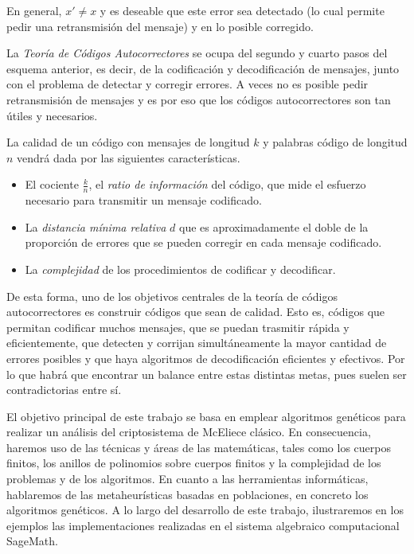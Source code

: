En general, $x' \neq x$ y es deseable que este error sea detectado (lo cual permite pedir una retransmisión del mensaje) y en lo posible corregido.

La \emph{Teoría de Códigos Autocorrectores} se ocupa del segundo y cuarto pasos del esquema anterior, es decir, de la codificación y decodificación de mensajes, junto con el problema de detectar y corregir errores. A veces no es posible pedir retransmisión de mensajes y es por eso que los códigos autocorrectores son tan útiles y necesarios.

La calidad de un código con mensajes de longitud $k$ y palabras código de longitud $n$ vendrá dada por las siguientes características.

\begin{itemize}
    \item El cociente $\frac{k}{n}$, el \emph{ratio de información} del código, que mide el esfuerzo necesario para transmitir un mensaje codificado.
    \item La \emph{distancia mínima relativa} $d$ que es aproximadamente el doble de la proporción de errores que se pueden corregir en cada mensaje codificado.
    \item La \emph{complejidad} de los procedimientos de codificar y decodificar.
\end{itemize}

De esta forma, uno de los objetivos centrales de la teoría de códigos autocorrectores es construir códigos que sean de calidad. Esto es, códigos que permitan codificar muchos mensajes, que se puedan trasmitir rápida y eficientemente, que detecten y corrijan simultáneamente la mayor cantidad de errores posibles y que haya algoritmos de decodificación eficientes y efectivos. Por lo que habrá que encontrar un balance entre estas distintas metas, pues suelen ser contradictorias entre sí.


El objetivo principal de este trabajo se basa en emplear algoritmos genéticos para realizar un análisis del criptosistema de McEliece clásico. En consecuencia, haremos uso de las técnicas y áreas de las matemáticas, tales como los cuerpos finitos, los anillos de polinomios sobre cuerpos finitos y la complejidad de los problemas y de los algoritmos. En cuanto a las herramientas informáticas, hablaremos de las metaheurísticas basadas en poblaciones, en concreto los algoritmos genéticos. A lo largo del desarrollo de este trabajo, ilustraremos en los ejemplos las implementaciones realizadas en el sistema algebraico computacional SageMath.

